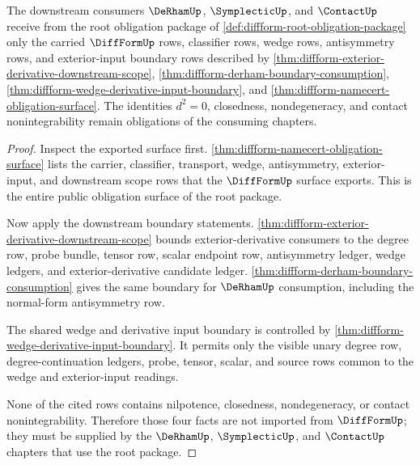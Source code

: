 \begin{theorem}
\label{thm:diffform-root-downstream-consumption-obligation}
The downstream consumers $\DeRhamUp$, $\SymplecticUp$, and $\ContactUp$
receive from the root obligation package of
\autoref{def:diffform-root-obligation-package} only the carried
$\DiffFormUp$ rows, classifier rows, wedge rows, antisymmetry rows, and
exterior-input boundary rows described by
\autoref{thm:diffform-exterior-derivative-downstream-scope},
\autoref{thm:diffform-derham-boundary-consumption},
\autoref{thm:diffform-wedge-derivative-input-boundary}, and
\autoref{thm:diffform-namecert-obligation-surface}. The identities $d^2=0$,
closedness, nondegeneracy, and contact nonintegrability remain obligations
of the consuming chapters.
\end{theorem}
\begin{proof}
Inspect the exported surface first.
\autoref{thm:diffform-namecert-obligation-surface} lists the carrier,
classifier, transport, wedge, antisymmetry, exterior-input, and downstream
scope rows that the $\DiffFormUp$ surface exports. This is the entire public
obligation surface of the root package.

Now apply the downstream boundary statements.
\autoref{thm:diffform-exterior-derivative-downstream-scope} bounds
exterior-derivative consumers to the degree row, probe bundle, tensor row,
scalar endpoint row, antisymmetry ledger, wedge ledgers, and
exterior-derivative candidate ledger.
\autoref{thm:diffform-derham-boundary-consumption} gives the same boundary
for $\DeRhamUp$ consumption, including the normal-form antisymmetry row.

The shared wedge and derivative input boundary is controlled by
\autoref{thm:diffform-wedge-derivative-input-boundary}. It permits only the
visible unary degree row, degree-continuation ledgers, probe, tensor, scalar,
and source rows common to the wedge and exterior-input readings.

None of the cited rows contains nilpotence, closedness, nondegeneracy, or
contact nonintegrability. Therefore those four facts are not imported from
$\DiffFormUp$; they must be supplied by the $\DeRhamUp$, $\SymplecticUp$, and
$\ContactUp$ chapters that use the root package.
\end{proof}
